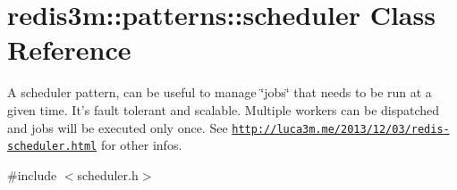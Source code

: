 \hypertarget{classredis3m_1_1patterns_1_1scheduler}{\section{redis3m\-:\-:patterns\-:\-:scheduler Class Reference}
\label{classredis3m_1_1patterns_1_1scheduler}
}


A scheduler pattern, can be useful to manage \char`\"{}jobs\char`\"{} that needs to be run at a given time. It's fault tolerant and scalable. Multiple workers can be dispatched and jobs will be executed only once. See \href{http://luca3m.me/2013/12/03/redis-scheduler.html}{\tt http\-://luca3m.\-me/2013/12/03/redis-\/scheduler.\-html} for other infos.  




{\ttfamily \#include $<$scheduler.\-h$>$}

